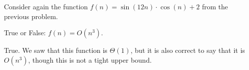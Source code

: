 \begin{prob}
    Consider again the function $f(n) = \sin(12n) \cdot \cos(n) + 2$ from the previous
    problem.

    True or False: $f(n) = O(n^3)$.

    \Tf{}

    \begin{soln}
        True. We saw that this function is $\Theta(1)$, but it is also correct to say
        that it is $O(n^3)$, though this is not a tight upper bound.
    \end{soln}

\end{prob}

